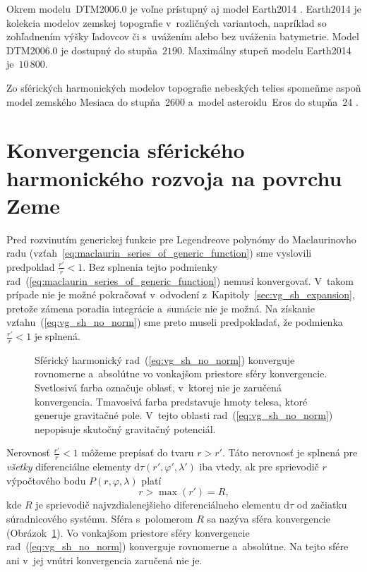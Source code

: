 \documentclass[a4paper, 12pt]{book}
\newcommand{\diff}{\mathrm d}
\begin{document}
Okrem modelu~DTM2006.0 je voľne prístupný aj model Earth2014 
\parencite{Hirt2015}.  Earth2014 je kolekcia modelov zemskej topografie 
v~rozličných variantoch, napríklad so zohľadnením výšky ľadovcov či s~uvážením 
alebo bez uváženia batymetrie.  Model DTM2006.0 je dostupný do stupňa~$2190$.  
Maximálny stupeň modelu Earth2014 je~$10\, 800$.

Zo sférických harmonických modelov topografie nebeských telies spomeňme aspoň 
model zemského Mesiaca do stupňa~2600 \parencite{Wieczorek2015} a~model 
asteroidu~Eros do stupňa~24 \parencite{Zuber2000}.






\section{Konvergencia sférického harmonického rozvoja na povrchu Zeme}
\label{sec:convergence_of_spherical_harmonics}

Pred rozvinutím generickej funkcie pre Legendreove polynómy do Maclaurinovho 
radu (vzťah~\ref{eq:maclaurin_series_of_generic_function}) sme vyslovili 
predpoklad $\frac{r'}{r} < 1$.  Bez splnenia tejto podmienky 
rad~(\ref{eq:maclaurin_series_of_generic_function}) nemusí konvergovať.  
V~takom prípade nie je možné pokračovať v~odvodení 
z~Kapitoly~\ref{sec:vg_sh_expansion}, pretože zámena poradia integrácie 
a~sumácie nie je možná.  Na získanie vzťahu~(\ref{eq:vg_sh_no_norm}) sme preto 
museli predpokladať, že podmienka $\frac{r'}{r} < 1$ je splnená.

\begin{figure}
\centering

\caption{Sférický harmonický rad~(\ref{eq:vg_sh_no_norm}) konverguje rovnomerne 
a~absolútne vo vonkajšom priestore sféry konvergencie.  Svetlosivá farba 
označuje oblasť, v~ktorej nie je zaručená konvergencia.  Tmavosivá farba 
predstavuje hmoty telesa, ktoré generuje gravitačné pole.  V~tejto oblasti 
rad~(\ref{eq:vg_sh_no_norm}) nepopisuje skutočný gravitačný potenciál.}
\label{fig:spherical_harmonics_convergence}
\end{figure}

Nerovnosť $\frac{r'}{r} < 1$ môžeme prepísať do tvaru $r > r'$.  Táto
nerovnosť je splnená pre \emph{všetky} diferenciálne elementy $\diff \tau(r',
\varphi', \lambda')$ iba vtedy, ak pre sprievodič $r$ výpočtového bodu $P(r,
\varphi, \lambda)$ platí
%
\begin{equation}
\label{eq:spherical_harmonic_convergence}
r > \max(r') = R{,}
\end{equation}
%
kde $R$ je sprievodič najvzdialenejšieho diferenciálneho elementu $\diff\tau$ 
od začiatku súradnicového systému.  Sféra s~polomerom $R$ sa nazýva sféra 
konvergencie \parencite{Hotine} 
(Obrázok~\ref{fig:spherical_harmonics_convergence}).  Vo vonkajšom priestore 
sféry konvergencie rad~(\ref{eq:vg_sh_no_norm}) konverguje rovnomerne 
a~absolútne.  Na tejto sfére ani v~jej vnútri konvergencia zaručená nie je.
\end{document}
